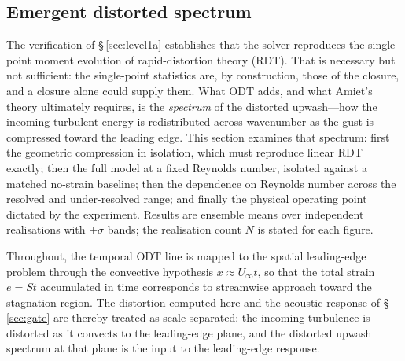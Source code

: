 \documentclass[lineno]{JFM-FLM_Au}
\begin{document}
%
%

\subsection{Emergent distorted spectrum}\label{sec:val-spectrum}

The verification of \S\,\ref{sec:level1a} establishes that the solver
reproduces the single-point moment evolution of rapid-distortion theory (RDT).
That is necessary but not sufficient: the single-point statistics are, by
construction, those of the closure, and a closure alone could supply them.
What ODT adds, and what Amiet's theory ultimately requires, is the
\emph{spectrum} of the distorted upwash---how the incoming turbulent energy is
redistributed across wavenumber as the gust is compressed toward the leading
edge. This section examines that spectrum: first the geometric compression in
isolation, which must reproduce linear RDT exactly; then the full model at a
fixed Reynolds number, isolated against a matched no-strain baseline; then the
dependence on Reynolds number across the resolved and under-resolved range; and
finally the physical operating point dictated by the experiment. Results are
ensemble means over independent realisations with $\pm\sigma$ bands; the
realisation count $N$ is stated for each figure.

Throughout, the temporal ODT line is mapped to the spatial leading-edge
problem through the convective hypothesis $x\approx U_\infty t$, so that the
total strain $e=St$ accumulated in time corresponds to streamwise approach
toward the stagnation region. The distortion computed here and the acoustic
response of \S\,\ref{sec:gate} are thereby treated as scale-separated: the
incoming turbulence is distorted as it convects to the leading-edge plane, and
the distorted upwash spectrum at that plane is the input to the leading-edge
response.
\end{document}
